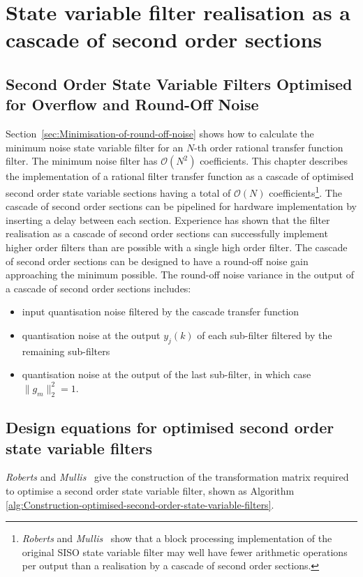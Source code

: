 \documentclass[a4paper,twoside,10pt,english]{report}
\begin{document}
\chapter{State variable filter realisation as a cascade of second order sections\label{sec:Second-order-cascade}}
\section{Second Order State Variable Filters Optimised for 
Overflow and Round-Off Noise}

Section~\ref{sec:Minimisation-of-round-off-noise} shows how to calculate the
minimum noise state variable filter for an $N$-th order rational transfer 
function filter. The minimum noise filter has $\mathcal{O}\left(N^{2}\right)$
coefficients. This chapter describes the implementation of a rational filter
transfer function as a cascade of optimised second order state variable 
sections having a total of $\mathcal{O}\left(N\right)$ coefficients\footnote{
\emph{Roberts} and
\emph{Mullis}~\cite[Table 10.2.1]{RobertsMullis_DigitalSignalProcessing} show
that a block processing
implementation of the original SISO state variable filter may well have fewer
arithmetic operations per output than a realisation by a cascade of second 
order sections.}. The cascade of second order sections can be pipelined for
hardware implementation by inserting a delay between each section. Experience
has shown that the filter realisation as a cascade of second order sections 
can successfully implement higher order filters than are possible with a
single high order filter. The cascade of second order sections can be designed
to have a round-off noise gain approaching the minimum possible. The round-off
noise variance in the output of a cascade of second order sections includes:
\begin{itemize}
\item input quantisation noise filtered by the cascade transfer function
\item quantisation noise at the output $y_{j}(k)$ of each sub-filter filtered
by the remaining sub-filters
\item quantisation noise at the output of the last sub-filter, in
which case ${\|g_{m}\|_{2}^{2}=1}$.
\end{itemize}

\section{Design equations for optimised second order state variable filters}
\emph{Roberts} and
\emph{Mullis}~\cite[Figure 9.14.1 with corrections]{RobertsMullis_DigitalSignalProcessing}
give the construction of the transformation matrix required to optimise a 
second order state variable filter, shown as Algorithm 
\ref{alg:Construction-optimised-second-order-state-variable-filters}.
\end{document}
